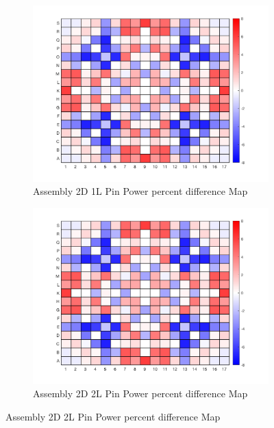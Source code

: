 \documentclass[12pt]{article}
\begin{document}
\begin{figure}[htb!]

        \begin{subfigure}{.5\textwidth} %
            \centering
            \includegraphics[scale=0.46]{Figures/2D_1L_pinpowerDiff.png} 
            \caption{Assembly 2D 1L Pin Power percent difference Map}
            \label{fig:sub-first}
        \end{subfigure}
        \begin{subfigure}{.5\textwidth}
            \centering
            \includegraphics[scale=0.46]{Figures/2D_2L_pinpowerDiff.png} 
            \caption{Assembly 2D 2L Pin Power percent difference Map}
            \label{fig:sub-second}
        \end{subfigure}


\end{figure}
\end{document}

